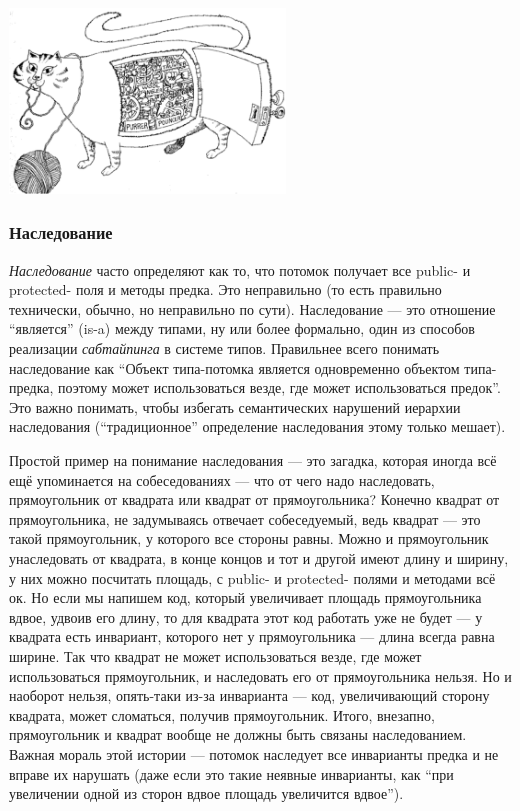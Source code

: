 \documentclass[a5paper]{article}
\begin{document}
\begin{center}
	\includegraphics[width=0.55\textwidth]{incapsulation.png}
\end{center}

\subsubsection{Наследование}

\textit{Наследование} часто определяют как то, что потомок получает все public- и protected- поля и методы предка. Это неправильно (то есть правильно технически, обычно, но неправильно по сути). Наследование --- это отношение ``является'' (is-a) между типами, ну или более формально, один из способов реализации \textit{сабтайпинга} в системе типов. Правильнее всего понимать наследование как ``Объект типа-потомка является одновременно объектом типа-предка, поэтому может использоваться везде, где может использоваться предок''. Это важно понимать, чтобы избегать семантических нарушений иерархии наследования (``традиционное'' определение наследования этому только мешает).

Простой пример на понимание наследования --- это загадка, которая иногда всё ещё упоминается на собеседованиях --- что от чего надо наследовать, прямоугольник от квадрата или квадрат от прямоугольника? Конечно квадрат от прямоугольника, не задумываясь отвечает собеседуемый, ведь квадрат --- это такой прямоугольник, у которого все стороны равны. Можно и прямоугольник унаследовать от квадрата, в конце концов и тот и другой имеют длину и ширину, у них можно посчитать площадь, с public- и protected- полями и методами всё ок. Но если мы напишем код, который увеличивает площадь прямоугольника вдвое, удвоив его длину, то для квадрата этот код работать уже не будет --- у квадрата есть инвариант, которого нет у прямоугольника --- длина всегда равна ширине. Так что квадрат не может использоваться везде, где может использоваться прямоугольник, и наследовать его от прямоугольника нельзя. Но и наоборот нельзя, опять-таки из-за инварианта --- код, увеличивающий сторону квадрата, может сломаться, получив прямоугольник. Итого, внезапно, прямоугольник и квадрат вообще не должны быть связаны наследованием. Важная мораль этой истории --- потомок наследует все инварианты предка и не вправе их нарушать (даже если это такие неявные инварианты, как ``при увеличении одной из сторон вдвое площадь увеличится вдвое'').
\end{document}

